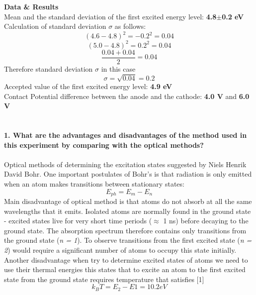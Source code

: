 \documentclass[a4paper,12pt]{article}
\begin{document}
\textbf{Data \& Results}\\
Mean and the standard deviation of the first excited energy level: \textbf{4.8$\pm$0.2 eV}\\
Calculation of standard deviation $\sigma$ as follows:
\begin{equation}
(4.6-4.8)^2=-0.2^2=0.04
\end{equation}
\begin{equation}
(5.0-4.8)^2=0.2^2=0.04
\end{equation}
\begin{equation}
\frac{0.04+0.04}{2}=0.04
\end{equation}
Therefore standard deviation $\sigma$ in this case
\begin{equation}
\sigma=\sqrt{0.04}=0.2
\end{equation}
Accepted value of the first excited energy level: \textbf{4.9 eV}\\
Contact Potential difference between the anode and the cathode: \textbf{4.0 V} and \textbf{6.0 V}\\\\\\
\textbf{1. What are the advantages and disadvantages of the method used in this experiment by comparing with the optical methods?}\\\\
Optical methods of determining the excitation states suggested by Niels Henrik David Bohr. One important postulates of Bohr's is that radiation is only emitted when an atom makes transitions between
stationary states:
\begin{equation}
E_{ph}=E_{m}-E_{n}
\end{equation}
Main disadvantage of optical method is that atoms do not absorb at all the same wavelengths
that it emits. Isolated atoms are normally found in the ground state - excited
states live for very short time periods ($\approx $ 1 ns) before decaying to the ground
state. The absorption spectrum therefore contains only transitions from the
ground state (\textit{n = 1}). To observe transitions from the first excited state
(\textit{n = 2}) would require a significant number of atoms to occupy this state
initially. Another disadvantage when try to determine excited states of atoms we need to use their thermal energies this states that  to excite an atom to the first excited state from the ground
state requires temperature that satisfies [1]
\begin{equation}
k_{B}T = E_{2} - E{1} = 10.2 eV
\end{equation}
\end{document}
